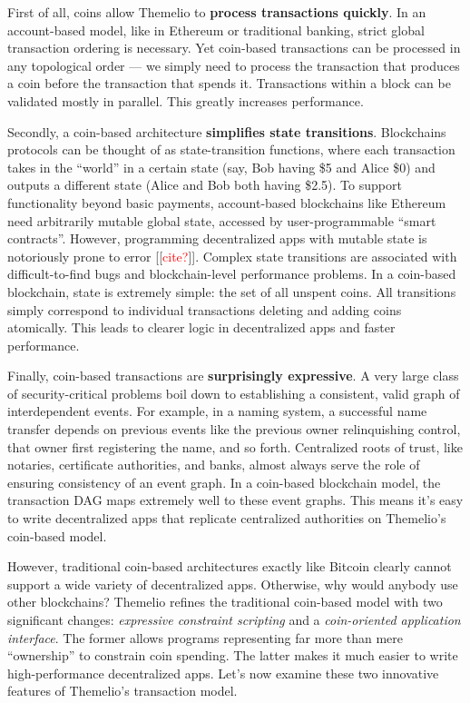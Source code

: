 \documentclass[headinclude]{scrbook}
\newcommand\mytodo[1]{[[\textcolor{red}{#1}]]}
\begin{document}
First of all, coins allow Themelio to \textbf{process transactions quickly}. In an account-based model, like in Ethereum or traditional banking, strict global transaction ordering is necessary. Yet coin-based transactions can be processed in any topological order --- we simply need to process the transaction that produces a coin before the transaction that spends it. Transactions within a block can be validated mostly in parallel. This greatly increases performance.

Secondly, a coin-based architecture \textbf{simplifies state transitions}. Blockchains protocols can be thought of as state-transition functions, where each transaction takes in the ``world'' in a certain state (say, Bob having \$5 and Alice \$0) and outputs a different state (Alice and Bob both having \$2.5). To support functionality beyond basic payments, account-based blockchains like Ethereum need arbitrarily mutable global state, accessed by user-programmable ``smart contracts''. However, programming decentralized apps with mutable state is notoriously prone to error \mytodo{cite?}. Complex state transitions are associated with difficult-to-find bugs and blockchain-level performance problems. In a coin-based blockchain, state is extremely simple: the set of all unspent coins. All transitions simply correspond to individual transactions deleting and adding coins atomically. This leads to clearer logic in decentralized apps and faster performance.

Finally, coin-based transactions are \textbf{surprisingly expressive}. A very large class of security-critical problems boil down to establishing a consistent, valid graph of interdependent events. For example, in a naming system, a successful name transfer depends on previous events like the previous owner relinquishing control, that owner first registering the name, and so forth. Centralized roots of trust, like notaries, certificate authorities, and banks, almost always serve the role of ensuring consistency of an event graph. In a coin-based blockchain model, the transaction DAG maps extremely well to these event graphs. This means it's easy to write decentralized apps that replicate centralized authorities on Themelio's coin-based model.

However, traditional coin-based architectures exactly like Bitcoin clearly cannot support a wide variety of decentralized apps. Otherwise, why would anybody use other blockchains? Themelio refines the traditional coin-based model with two significant changes: \emph{expressive constraint scripting} and a \textit{coin-oriented application interface}. The former allows programs representing far more than mere ``ownership'' to constrain coin spending. The latter makes it much easier to write high-performance decentralized apps. Let's now examine these two innovative features of Themelio's transaction model.
\end{document}

